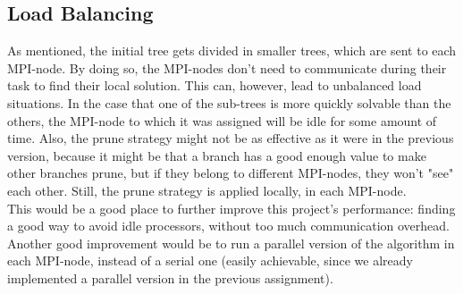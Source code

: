 \documentclass[paper=a4, fontsize=11pt]{scrartcl} %
\numberwithin{equation}{section} %
\numberwithin{figure}{section} %
\numberwithin{table}{section} %
\begin{document}
\subsection{Load Balancing}
As mentioned, the initial tree gets divided in smaller trees, which are sent to each MPI-node. By doing so, the MPI-nodes don't need to
communicate during their task to find their local solution. This can, however, lead to unbalanced load situations. In the case that one
of the sub-trees is more quickly solvable than the others, the MPI-node to which it was assigned will be idle for some amount of time.
Also, the prune strategy might not be as effective as it were in the previous version, because it might be that
a branch has a good enough value to make other branches prune, but if they belong to different MPI-nodes, they won't "see" each other.
Still, the prune strategy is applied locally, in each MPI-node.\\[3pt]
This would be a good place to further improve this project's performance: finding a good way to avoid idle processors, without
too much communication overhead. Another good improvement would be to run a parallel version of the algorithm in each MPI-node, instead
of a serial one (easily achievable, since we already implemented a parallel version in the previous assignment).
\end{document}
